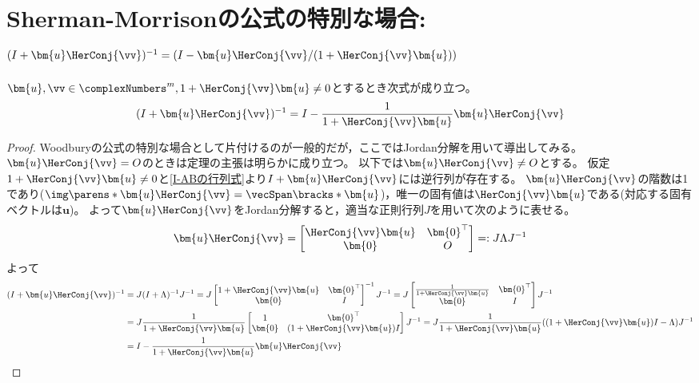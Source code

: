     \section{Sherman-Morrisonの公式の特別な場合\texorpdfstring{: $(I+\bm{u}\HerConj{\vv})^{-1} = (I-\bm{u}\HerConj{\vv}/(1+\HerConj{\vv}\bm{u}))$}{}}
        \label{Sherman-Morrisonの公式の特別な場合}
        \begin{shadebox}
            $\bm{u},\vv \in \complexNumbers^m, 1+\HerConj{\vv}\bm{u} \neq 0$とするとき次式が成り立つ。
            \[ (I+\bm{u}\HerConj{\vv})^{-1} = I - \frac{1}{1+\HerConj{\vv}\bm{u}}\bm{u}\HerConj{\vv} \]
        \end{shadebox}
        \begin{proof}
            Woodburyの公式の特別な場合として片付けるのが一般的だが，ここではJordan分解を用いて導出してみる。
            $\bm{u}\HerConj{\vv} = O$のときは定理の主張は明らかに成り立つ。
            以下では$\bm{u}\HerConj{\vv} \neq O$とする。
            仮定$1+\HerConj{\vv}\bm{u} \neq 0$と\ref{I-ABの行列式}より$I+\bm{u}\HerConj{\vv}$には逆行列が存在する。
            $\bm{u}\HerConj{\vv}$の階数は1であり($\img\parens*{\bm{u}\HerConj{\vv}} = \vecSpan\bracks*{\bm{u}}$)，唯一の固有値は$\HerConj{\vv}\bm{u}$である(対応する固有ベクトルは$\bm{u}$)。
            よって$\bm{u}\HerConj{\vv}$をJordan分解すると，適当な正則行列$J$を用いて次のように表せる。
            \[
                \bm{u}\HerConj{\vv} =
                \begin{bmatrix}
                    \HerConj{\vv}\bm{u} & \bm{0}^\top \\
                    \bm{0} & O
                \end{bmatrix}
                =: J\Lambda J^{-1}
            \]
            よって
            \begin{align*}
                (I+\bm{u}\HerConj{\vv})^{-1} &= J(I + \Lambda)^{-1}J^{-1} = J
                \begin{bmatrix}
                    1+\HerConj{\vv}\bm{u} & \bm{0}^\top \\
                    \bm{0} & I
                \end{bmatrix}
                ^{-1}J^{-1} = J
                \begin{bmatrix}
                    \frac{1}{1+\HerConj{\vv}\bm{u}} & \bm{0}^\top \\
                    \bm{0} & I
                \end{bmatrix}
                J^{-1} \\
                &= J\frac{1}{1+\HerConj{\vv}\bm{u}}
                \begin{bmatrix}
                    1 & \bm{0}^\top \\
                    \bm{0} & (1+\HerConj{\vv}\bm{u})I
                \end{bmatrix}
                J^{-1} = J\frac{1}{1+\HerConj{\vv}\bm{u}}((1+\HerConj{\vv}\bm{u})I - \Lambda)J^{-1} \\
                &= I - \frac{1}{1+\HerConj{\vv}\bm{u}}\bm{u}\HerConj{\vv}
            \end{align*}
        \end{proof}
